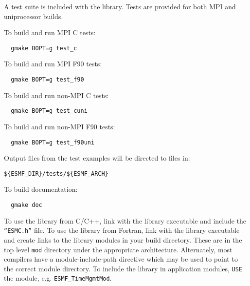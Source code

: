 A test suite is included with the library.  Tests are provided for both MPI
and uniprocessor builds. 

\noindent To build and run MPI C tests:

\begin{verbatim}
  gmake BOPT=g test_c
\end{verbatim}

\noindent To build and run MPI F90 tests:
\begin{verbatim}
  gmake BOPT=g test_f90
\end{verbatim}

\noindent To build and run non-MPI C tests:
\begin{verbatim}
  gmake BOPT=g test_cuni
\end{verbatim}

\noindent To build and run non-MPI F90 tests:
\begin{verbatim}
  gmake BOPT=g test_f90uni
\end{verbatim}

Output files from the test examples will be directed to files in:
\begin{verbatim}
${ESMF_DIR}/tests/${ESMF_ARCH}
\end{verbatim}

\noindent To build documentation:
\begin{verbatim}
  gmake doc
\end{verbatim}

To use the library from C/C++, link with the library executable and include
the {\tt ``ESMC.h''} file.
To use the library from Fortran, link with the library executable and
create links to the library modules in your build directory.  These are
in the top level {\tt mod} directory under the appropriate architecture.  Alternately, 
most compilers have a module-include-path directive which may be used to point
to the correct module directory.
To include the library in application modules, {\tt USE} the
module, e.g. {\tt ESMF\_TimeMgmtMod}.  
